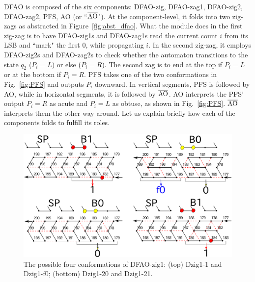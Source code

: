 DFAO is composed of the six components: DFAO-zig, DFAO-zag1, DFAO-zig2, DFAO-zag2, PFS, AO (or  ``$\overline{\rm AO}$").
At the component-level, it folds into two zig-zags as abstracted in Figure~\ref{fig:abst_dfao}.
What the module does in the first zig-zag is to have DFAO-zig1s and DFAO-zag1s read the current count $i$ from its LSB and ``mark" the first 0, while propagating $i$.
In the second zig-zag, it employs DFAO-zig2s and DFAO-zag2s to check whether the automaton transitions to the state $q_2$ ($P_i = L$) or else ($P_i = R$).
The second zag is to end at the top if $P_i = L$ or at the bottom if $P_i = R$.
PFS takes one of the two conformations in Fig.~\ref{fig:PFS} and outputs $P_i$ downward.
In vertical segments, PFS is followed by AO, while in horizontal segments, it is followed by $\overline{\rm AO}$.
AO interprets the PFS' output $P_i = R$ as acute and $P_i = L$ as obtuse, as shown in Fig.~\ref{fig:PFS}.
$\overline{\rm AO}$ interprets them the other way around.
Let us explain briefly how each of the components folds to fulfill its roles.

\begin{figure}[h]
\includegraphics[width=\linewidth]{pic/DFAO-zig1.png}  
  \caption{The possible four conformations of DFAO-zig1: (top) Dzig1-1 and Dzig1-f0; (bottom) Dzig1-20 and Dzig1-21.}
  \label{fig:DFAO-zig1}
\end{figure} 


